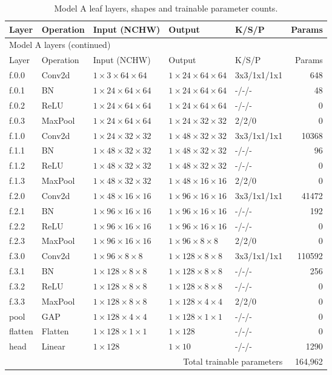 \begingroup\scriptsize\setlength{\tabcolsep}{3pt}
\begin{longtable}{lllllr}
\caption{Model A leaf layers, shapes and trainable parameter counts.}\label{tab:model_a_layers}\\
\toprule Layer & Operation & Input (NCHW) & Output & K/S/P & Params \\ \midrule\endfirsthead
\multicolumn{6}{l}{Model A layers (continued)}\\\toprule Layer & Operation & Input (NCHW) & Output & K/S/P & Params \\ \midrule\endhead
f.0.0 & Conv2d & $1\times3\times64\times64$ & $1\times24\times64\times64$ & 3x3/1x1/1x1 & 648 \\
f.0.1 & BN & $1\times24\times64\times64$ & $1\times24\times64\times64$ & -/-/- & 48 \\
f.0.2 & ReLU & $1\times24\times64\times64$ & $1\times24\times64\times64$ & -/-/- & 0 \\
f.0.3 & MaxPool & $1\times24\times64\times64$ & $1\times24\times32\times32$ & 2/2/0 & 0 \\
f.1.0 & Conv2d & $1\times24\times32\times32$ & $1\times48\times32\times32$ & 3x3/1x1/1x1 & 10368 \\
f.1.1 & BN & $1\times48\times32\times32$ & $1\times48\times32\times32$ & -/-/- & 96 \\
f.1.2 & ReLU & $1\times48\times32\times32$ & $1\times48\times32\times32$ & -/-/- & 0 \\
f.1.3 & MaxPool & $1\times48\times32\times32$ & $1\times48\times16\times16$ & 2/2/0 & 0 \\
f.2.0 & Conv2d & $1\times48\times16\times16$ & $1\times96\times16\times16$ & 3x3/1x1/1x1 & 41472 \\
f.2.1 & BN & $1\times96\times16\times16$ & $1\times96\times16\times16$ & -/-/- & 192 \\
f.2.2 & ReLU & $1\times96\times16\times16$ & $1\times96\times16\times16$ & -/-/- & 0 \\
f.2.3 & MaxPool & $1\times96\times16\times16$ & $1\times96\times8\times8$ & 2/2/0 & 0 \\
f.3.0 & Conv2d & $1\times96\times8\times8$ & $1\times128\times8\times8$ & 3x3/1x1/1x1 & 110592 \\
f.3.1 & BN & $1\times128\times8\times8$ & $1\times128\times8\times8$ & -/-/- & 256 \\
f.3.2 & ReLU & $1\times128\times8\times8$ & $1\times128\times8\times8$ & -/-/- & 0 \\
f.3.3 & MaxPool & $1\times128\times8\times8$ & $1\times128\times4\times4$ & 2/2/0 & 0 \\
pool & GAP & $1\times128\times4\times4$ & $1\times128\times1\times1$ & -/-/- & 0 \\
flatten & Flatten & $1\times128\times1\times1$ & $1\times128$ & -/-/- & 0 \\
head & Linear & $1\times128$ & $1\times10$ & -/-/- & 1290 \\
\midrule\multicolumn{5}{r}{Total trainable parameters} & 164,962 \\ \bottomrule
\end{longtable}
\endgroup
